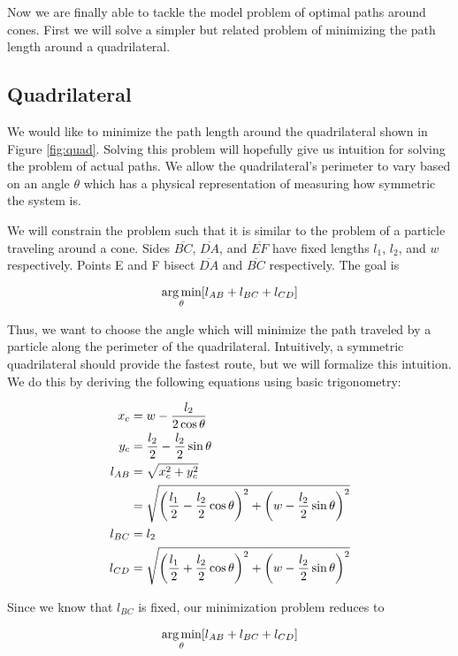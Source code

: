Now we are finally able to tackle the model problem of optimal paths around cones. First we will solve a simpler but related problem of minimizing the path length around a quadrilateral.

\subsection{Quadrilateral}

We would like to minimize the path length around the quadrilateral shown in Figure \ref{fig:quad}. Solving this problem will hopefully give us intuition for solving the problem of actual paths. We allow the quadrilateral's perimeter to vary based on an angle $\theta$ which has a physical representation of measuring how symmetric the system is.


We will constrain the problem such that it is similar to the problem of a particle traveling around a cone. Sides $\overline{BC}$, $\overline{DA}$, and $\overline{EF}$ have fixed lengths $l_1$, $l_2$, and $w$ respectively. Points E and F bisect $\overline{DA}$ and $\overline{BC}$ respectively. The goal is

\[
\argmin_{\theta} \bracket{l_{AB} + l_{BC} + l_{CD}}
\]

Thus, we want to choose the angle which will minimize the path traveled by a particle along the perimeter of the quadrilateral. Intuitively, a symmetric quadrilateral should provide the fastest route, but we will formalize this intuition. We do this by deriving the following equations using basic trigonometry:

\begin{align}
  x_c& = w - \frac{l_2}{2 \cos{\theta}}\\
  y_c& = \frac{l_2}{2} - \frac{l_2}{2} \sin{\theta}\\
  l_{AB}& = \sqrt{x_c^2 + y_c^2}\\
  & = \sqrt{ \paren{\frac{l_1}{2} - \frac{l_2}{2} \cos\theta}^2 + \paren{w - \frac{l_2}{2} \sin\theta}^2 }\\
  l_{BC}& = l_2\\
  l_{CD}& = \sqrt{\paren{\frac{l_1}{2} + \frac{l_2}{2} \cos\theta}^2 + \paren{w - \frac{l_2}{2} \sin\theta}^2 }
\end{align}

Since we know that $l_{BC}$ is fixed, our minimization problem reduces to

\[
\argmin_{\theta} \bracket{l_{AB} + l_{BC} + l_{CD}}
\]

